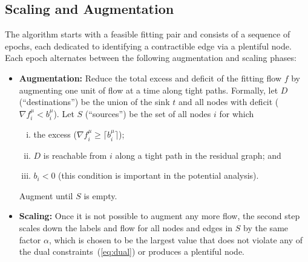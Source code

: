 \documentclass[11pt]{article}
\theoremstyle{definition}
\theoremstyle{definition}
\newcommand{\rewrite}[1]{#1}%
\newcommand{\todo}[1]{}%
\begin{document}
    \subsection{Scaling and Augmentation}
    \label{sec:sub-ppn}
	The algorithm starts with a feasible fitting pair and consists of a sequence
    of epochs, each dedicated to identifying a contractible edge via a plentiful node.
    Each epoch alternates between the following augmentation and scaling phases:
    \begin{itemize}
    \item \textbf{Augmentation:} Reduce the total excess and deficit of the fitting flow $f$
    by augmenting one unit of flow at a time along tight paths. Formally, let
    $D$ (``destinations'') be the union of the sink $t$ and all nodes with 
    deficit ($\nabla f_i^{\mu} < b_i^{\mu}$). Let $S$ (``sources'') be
    the set of all nodes $i$ for which
    \begin{enumerate}[(i)]
    \item the excess ($\nabla f_i^{\mu} \ge \lceil b_i^{\mu} \rceil$);
    \item $D$ is reachable from $i$ along a tight path in the residual graph; and
    \item $b_i < 0$ (this condition is important in the potential analysis).
    \end{enumerate}
    Augment until $S$ is empty.
    \item \textbf{Scaling:} Once it is not possible to augment any more flow, the second step scales down
    the labels and flow for all nodes and edges in $S$ by the same factor $\alpha$,
    which is chosen to be the largest value that \rewrite{does not violate} any of the dual
    constraints~(\ref{eq:dual}) or produces a plentiful node.
    \end{itemize}

    \todo{RE-WRITE AS DJIKSTRAS}
\end{document}
